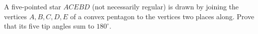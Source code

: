 A five-pointed star $ACEBD$ (not necessarily regular) is drawn by joining the vertices $A,B,C,D,E$ of a convex pentagon to the vertices two places along. Prove that its five tip angles sum to $180^\circ$.
